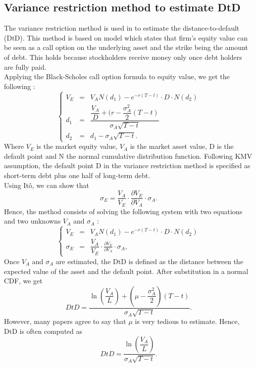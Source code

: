 \subsection{Variance restriction method to estimate DtD}
The variance restriction method is used in \citet{DSW} to estimate the distance-to-default (DtD). This method is based on \citet{Merton1974} model which states that firm's equity value can be seen as a call option on the underlying asset and the strike being the amount of debt. This holds because stockholders receive money only once debt holders are fully paid. \\
Applying the Black-Scholes call option formula to equity value, we get the following :
\begin{equation*}
\left\{
  \begin{array}{lll}
    V_E & = & V_A N(d_1) - e^{-r(T-t)} \cdot D \cdot N(d_2)\\
    d_1 & = & \dfrac{\dfrac{V_A}{D}+(r-\dfrac{\sigma_A^2}{2}(T-t)}{\sigma_A \sqrt{T-t}} \\
    d_2 & = & d_1 - \sigma_A \sqrt{T-t}.
  \end{array}
\right.
\end{equation*}
Where $V_E$ is the market equity value, $V_A$ is the market asset value, D is the default point and N the normal cumulative distribution function. Following KMV assumption, the default point D in the variance restriction method is specified as short-term debt plus one half of long-term debt.\\
Using It\^o, we can show that 
\begin{equation*}
\sigma_E = \dfrac{V_A}{V_E}\cdot \frac{\partial V_E}{\partial V_A}\cdot \sigma_A.
\end{equation*}
Hence, the method consists of solving the following system with two equations and two unknowns $V_A$ and $\sigma_A$ :
\begin{equation*}
\left\{
  \begin{array}{lll}
    V_E & = & V_A N(d_1) - e^{-r(T-t)} \cdot D \cdot N(d_2)\\
    \sigma_E & = & \dfrac{V_A}{V_E}\cdot \frac{\partial V_E}{\partial V_A}\cdot \sigma_A,
  \end{array}
\right.
\end{equation*}
Once $V_A$ and $\sigma_A$ are estimated, the DtD is defined as the distance between the expected value of the asset and the default point. After substitution in a normal CDF, we get
\begin{equation}
DtD = \dfrac{\ln(\dfrac{V_A}{L})+(\mu-\dfrac{\sigma_A^2}{2})(T-t)}{\sigma_A \sqrt{T-t}}.
\end{equation}
However, many papers agree to say that $\mu$ is very tedious to estimate. Hence, DtD is often computed as
\begin{equation}
DtD = \dfrac{\ln(\dfrac{V_A}{L})}{\sigma_A \sqrt{T-t}}.
\end{equation}

